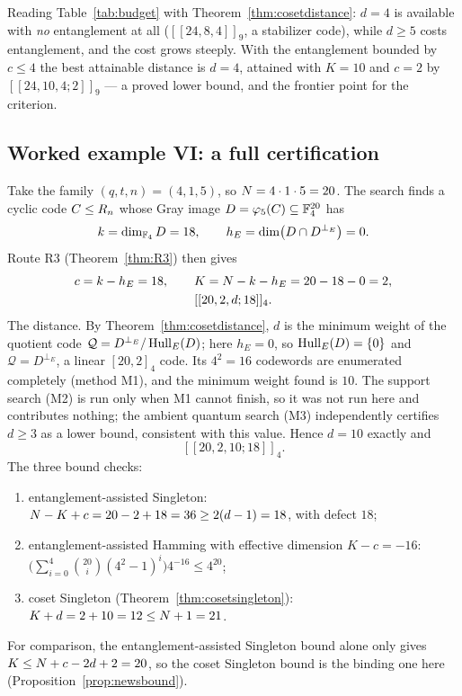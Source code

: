 Reading Table~\ref{tab:budget} with Theorem~\ref{thm:cosetdistance}: $d=4$ is
available with \emph{no} entanglement at all ($[[24,8,4]]_9$, a stabilizer
code), while $d\ge5$ costs entanglement, and the cost grows steeply. With the
entanglement bounded by $c\le4$ the best attainable distance is $d=4$, attained
with $K=10$ and $c=2$ by $[[24,10,4;2]]_9$ --- a proved lower bound, and the
frontier point for the criterion.

\subsection{Worked example VI: a full certification}

\begin{example}\label{ex:certify}
Take the family $(q,t,n)=(4,1,5)$, so $N=4\cdot1\cdot5=20$. The search
finds a cyclic code $C\le R_n$ whose Gray image $D=\varphi_5(C)\subseteq
\mathbb F_4^{20}$ has
\[
  k=\dim_{\mathbb F_4}D=18,\qquad h_E=\dim\bigl(D\cap D^{\perp_E}\bigr)=0 .
\]
Route R3 (Theorem~\ref{thm:R3}) then gives
\[
  \begin{gathered}
    c=k-h_E=18,\qquad K=N-k-h_E=20-18-0=2,\\
    [[20,2,d;18]]_4 .
  \end{gathered}
\]
The distance. By Theorem~\ref{thm:cosetdistance}, $d$ is the minimum weight of
the quotient code $\mathcal Q=D^{\perp_E}/\operatorname{Hull}_E(D)$; here $h_E=0$, so
$\operatorname{Hull}_E(D)=\{0\}$ and $\mathcal Q=D^{\perp_E}$, a linear $[20,2]_4$ code. Its
$4^2=16$ codewords are enumerated completely (method M1), and the minimum
weight found is $10$. The support search (M2) is run only when M1 cannot
finish, so it was not run here and contributes nothing; the ambient quantum
search (M3) independently certifies $d\ge3$ as a lower bound, consistent with
this value. Hence $d=10$ exactly and
\[
  [[20,2,10;18]]_4 .
\]
The three bound checks:
\begin{enumerate}[label=\textnormal{(\roman*)},leftmargin=*]
\item entanglement-assisted Singleton:
  $N-K+c=20-2+18=36\ge2(d-1)=18$, with defect $18$;
\item entanglement-assisted Hamming with effective dimension $K-c=-16$:
  $\bigl(\sum_{i=0}^{4}\binom{20}{i}(4^2-1)^i\bigr)4^{-16}\le4^{20}$;
\item coset Singleton (Theorem~\ref{thm:cosetsingleton}):
  $K+d=2+10=12\le N+1=21$.
\end{enumerate}
For comparison, the entanglement-assisted Singleton bound alone only gives
$K\le N+c-2d+2=20$, so the coset Singleton bound is the binding one here
(Proposition~\ref{prop:newsbound}).


\end{example}
